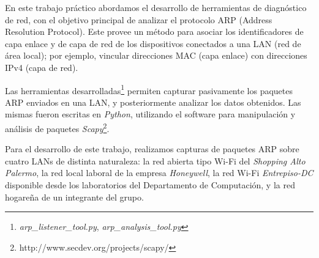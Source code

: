 En este trabajo práctico abordamos el desarrollo de herramientas de diagnóstico de red, con el objetivo principal de analizar el protocolo ARP (Address Resolution Protocol). Este provee un método para asociar los identificadores de capa enlace y de capa de red de los dispositivos conectados a una LAN (red de área local); por ejemplo, vincular direcciones MAC (capa enlace) con direcciones IPv4 (capa de red).

Las herramientas desarrolladas\footnote{\emph{arp\_listener\_tool.py}, \emph{arp\_analysis\_tool.py}} permiten capturar pasivamente los paquetes ARP enviados en una LAN, y posteriormente analizar los datos obtenidos. Las mismas fueron escritas en \emph{Python}, utilizando el software para manipulación y análisis de paquetes \emph{Scapy}\footnote{http://www.secdev.org/projects/scapy/}.

Para el desarrollo de este trabajo, realizamos capturas de paquetes ARP sobre cuatro LANs de distinta naturaleza: la red abierta tipo Wi-Fi del \emph{Shopping Alto Palermo}, la red local laboral de la empresa \emph{Honeywell}, la red Wi-Fi \emph{Entrepiso-DC} disponible desde los laboratorios del Departamento de Computación, y la red hogareña de un integrante del grupo.